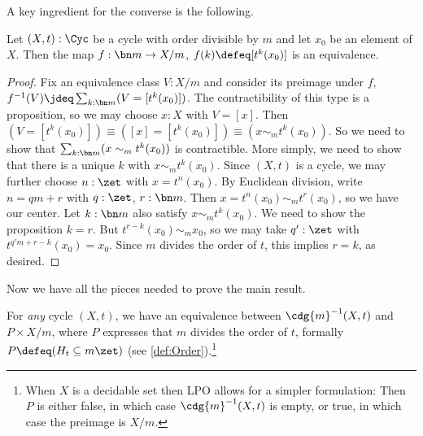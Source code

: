 A key ingredient for the converse is the following.
\begin{lemma}\label{lem:X-mod-m-chosen}
  Let $(X,t):\Cyc$ be a cycle with order divisible by $m$
  and let $x_0$ be an element of $X$.
  Then the map $f : \bn m \to X/m$, $f(k) \defeq [t^k(x_0)]$
  is an equivalence.
\end{lemma}
\begin{proof}
  Fix an equivalence class $V:X/m$ 
  and consider its 
  preimage under $f$, $f^{-1}(V) \jdeq \sum_{k:\bn m}(V=[t^k(x_0)])$.
  The contractibility of this type is a proposition, so we may choose
  $x:X$ with $V=[x]$.
  Then $(V=[t^k(x_0)])\equiv([x]=[t^k(x_0)])\equiv(x\sim_m t^k(x_0))$.
  So we need to show that $\sum_{k:\bn m}(x\sim_m t^k(x_0))$ is contractible.
  More simply, we need to show that there is a unique $k$ with $x\sim_m t^k(x_0)$.
  Since $(X,t)$ is a cycle, we may further choose $n:\zet$ with $x=t^n(x_0)$.
  By Euclidean division, write $n=qm+r$ with $q:\zet$, $r:\bn m$.
  Then $x = t^n(x_0) \sim_m t^r(x_0)$, so we have our center.
  Let $k:\bn m$ also satisfy $x\sim_m t^k(x_0)$.
  We need to show the proposition $k=r$.
  But $t^{r-k}(x_0) \sim_m x_0$, so we may take $q':\zet$ 
  with $t^{q'm+r-k}(x_0)=x_0$.
  Since $m$ divides the order of $t$, this implies $r=k$, as desired.
\end{proof}
Now we have all the pieces needed to prove the main result.
\begin{construction}\label{thm:fiber-cdg}
  For \emph{any} cycle $(X,t)$, we have an equivalence
  between $\cdg{m}^{-1}(X,t)$ and
  $P\times X/m$, where $P$ expresses that $m$ 
  divides the order of $t$, formally 
  $P \defeq (H_t \subseteq m\zet)$ (see \cref{def:Order}).\footnote{%
  When $X$ is a decidable set then LPO allows for a simpler formulation:
  Then $P$ is either false, in which case $\cdg{m}^{-1}(X,t)$ is empty,
  or true, in which case the preimage is $X/m$.
  }
\end{construction}

